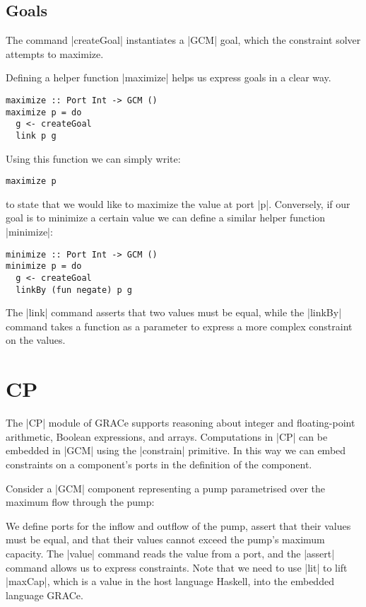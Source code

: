 \documentclass[a4paper]{article}
\begin{document}
\subsection{Goals}\label{goals}
The command |createGoal| instantiates a |GCM| goal, which the constraint
solver attempts to maximize.

Defining a helper function |maximize| helps us express goals in a clear way.
\begin{verbatim}
maximize :: Port Int -> GCM ()
maximize p = do
  g <- createGoal
  link p g
\end{verbatim}
Using this function we can simply write:
\begin{verbatim}
maximize p
\end{verbatim}
to state that we would like to maximize the value at port |p|. Conversely, if
our goal is to minimize a certain value we can define a similar helper function
|minimize|:
\begin{verbatim}
minimize :: Port Int -> GCM ()
minimize p = do
  g <- createGoal
  linkBy (fun negate) p g
\end{verbatim}
The |link| command asserts that two values must be equal, while the |linkBy|
command takes a function as a parameter to express a more complex constraint on
the values.

\section{CP}

The |CP| module of GRACe supports reasoning about integer and floating-point
arithmetic, Boolean expressions, and arrays. Computations in |CP| can be
embedded in |GCM| using the |constrain| primitive. In this way we can embed
constraints on a component's ports in the definition of the component.

Consider a |GCM| component representing a pump parametrised over the maximum
flow through the pump:

We define ports for the inflow and outflow of the pump, assert that their values
must be equal, and that their values cannot exceed the pump's maximum capacity.
The |value| command reads the value from a port, and the |assert| command allows
us to express constraints. Note that we need to use |lit| to lift |maxCap|,
which is a value in the host language Haskell, into the embedded language GRACe.
\end{document}
